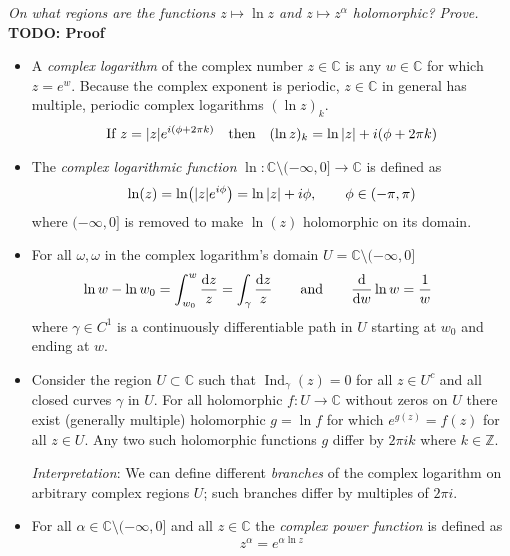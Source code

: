 \documentclass[11pt, a4paper]{article}
\newcommand{\question}[1]{\textit{#1}\vspace{2mm}}
\newcommand{\C}{\mathbb{C}} %
\newcommand{\diff}{\mathop{}\!\mathrm{d}} %
\begin{document}
\question{On what regions are the functions $ z \mapsto \ln z $ and $ z \mapsto z^{\alpha} $ holomorphic? Prove.} \textbf{TODO: Proof}
\begin{itemize}
	\item A \textit{complex logarithm} of the complex number $ z \in \C $ is any $ w \in \C $ for which $ z = e^{w} $. Because the complex exponent is periodic, $ z \in \C $ in general has multiple, periodic complex logarithms $ (\ln z)_{k} $. 
	\begin{equation*}
		\text{If } z = \abs{z}e^{i(\phi + 2\pi k)} \quad \text{then} \quad	(\ln z)_k = \ln \abs{z} + i(\phi + 2\pi k)
	\end{equation*}
	
	\item The \textit{complex logarithmic function} $ \ln : \C \setminus (-\infty, 0] \to \C $ is defined as
	\begin{equation*}
		\ln (z) = \ln (\abs{z}e^{i\phi}) = \ln \abs{z} + i \phi,  \qquad \phi \in (-\pi, \pi)
	\end{equation*}
	where $ (-\infty, 0] $ is removed to make $ \ln (z) $ holomorphic on its domain.
	
	\item For all $ \omega, \omega $ in the complex logarithm's domain $ U = \C \setminus (-\infty, 0]  $
	\begin{equation*}
		\ln w - \ln w_0 = \int_{w_0}^{w} \frac{\diff z}{z} = \int_{\gamma} \frac{\diff z}{z} \qquad \text{and} \qquad \dv{}{w} \ln w = \frac{1}{w} \qquad
	\end{equation*}
	where $ \gamma \in C^1 $ is a continuously differentiable path in $ U $ starting at $ w_0 $ and ending at $ w $.
	
	\item Consider the region $ U \subset \C $ such that $ \operatorname{Ind}_{\gamma}(z) = 0 $ for all $ z \in U^{c} $ and all closed curves $ \gamma $ in $ U $. For all holomorphic $ f: U \to \C $ without zeros on $ U $ there exist (generally multiple) holomorphic $ g = \ln f $ for which $ e^{g(z)} = f(z) $ for all $ z \in U $. Any two such holomorphic functions $ g $ differ by $ 2\pi i k $ where $ k \in \mathbb{Z} $. 
	
	\textit{Interpretation}: We can define different \textit{branches} of the complex logarithm on arbitrary complex regions $ U $; such branches differ by multiples of $ 2\pi i $.
	
	\item For all $ \alpha \in \C \setminus (-\infty, 0]$ and all $ z \in \C $ the \textit{complex power function} is defined as
	\begin{equation*}
		z^{\alpha} = e^{\alpha \ln z}
	\end{equation*}
	
\end{itemize}
\end{document}
